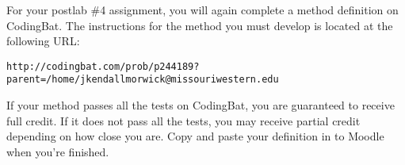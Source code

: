 For your postlab \#4 assignment, you will again complete a method definition on CodingBat. The instructions for the method you must develop is located at the following URL:

\begin{verbatim}
http://codingbat.com/prob/p244189?parent=/home/jkendallmorwick@missouriwestern.edu
\end{verbatim}

If your method passes all the tests on CodingBat, you are guaranteed to receive full credit. If it does not pass all the tests, you may receive partial credit depending on how close you are. Copy and paste your definition in to Moodle when you're finished. 